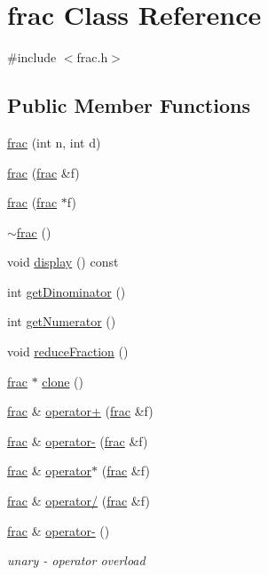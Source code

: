 \hypertarget{classfrac}{\section{frac Class Reference}
\label{classfrac}
}


{\ttfamily \#include $<$frac.\-h$>$}

\subsection*{Public Member Functions}
\begin{DoxyCompactItemize}
\item 
\hyperlink{classfrac_a051365bd6877cb87bc310c45fc90b28c}{frac} (int n, int d)
\item 
\hyperlink{classfrac_a99fdb2273c3f9de4efa6c5cc5f8174b0}{frac} (\hyperlink{classfrac}{frac} \&f)
\item 
\hyperlink{classfrac_a424fb4fa68e8b33248986a8954567e26}{frac} (\hyperlink{classfrac}{frac} $\ast$f)
\item 
\hyperlink{classfrac_add2e0f622517541c3f892dbaedad678c}{$\sim$frac} ()
\item 
void \hyperlink{classfrac_abdb433b58cfff1fc94ed3eb149555b5c}{display} () const 
\item 
int \hyperlink{classfrac_aa47cf219cad50f87599ad7a56334c5bc}{get\-Dinominator} ()
\item 
int \hyperlink{classfrac_af7fdff849611b59e0ca1afa87b05d433}{get\-Numerator} ()
\item 
void \hyperlink{classfrac_a9b63fe9aaeb67fb3a939f9ec22e17bc7}{reduce\-Fraction} ()
\item 
\hyperlink{classfrac}{frac} $\ast$ \hyperlink{classfrac_a3cebc2a3d23a8ecf175d7d2cc02e8a77}{clone} ()
\item 
\hyperlink{classfrac}{frac} \& \hyperlink{classfrac_a89a1b822d370c916106594d5f2267493}{operator+} (\hyperlink{classfrac}{frac} \&f)
\item 
\hyperlink{classfrac}{frac} \& \hyperlink{classfrac_ad1f48e0b2c94873016bd895177f7887c}{operator-\/} (\hyperlink{classfrac}{frac} \&f)
\item 
\hyperlink{classfrac}{frac} \& \hyperlink{classfrac_a807ad5aa49d46adab972e087496c0a72}{operator$\ast$} (\hyperlink{classfrac}{frac} \&f)
\item 
\hyperlink{classfrac}{frac} \& \hyperlink{classfrac_a12cf51a8127c7495958e7dcdd5cf28af}{operator/} (\hyperlink{classfrac}{frac} \&f)
\item 
\hyperlink{classfrac}{frac} \& \hyperlink{classfrac_afe39ee9c2d76646d0e48fcb60716883b}{operator-\/} ()
\begin{DoxyCompactList}\small\item\em unary -\/ operator overload \end{DoxyCompactList}\end{DoxyCompactItemize}
